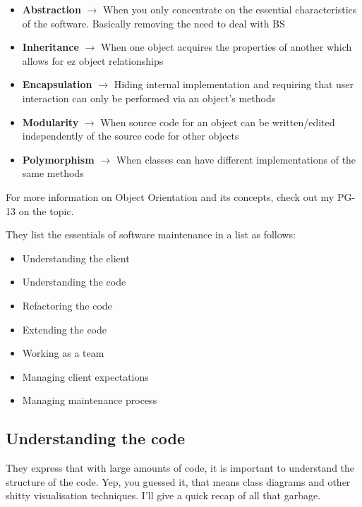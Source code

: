 \documentclass{article}
\begin{document}
\begin{itemize}
    \item \textbf{Abstraction} $\longrightarrow$ When you only concentrate on the essential characteristics of the software. Basically removing the need to deal with BS
    \item \textbf{Inheritance} $\longrightarrow$ When one object acquires the properties of another which allows for ez object relationships
    \item \textbf{Encapsulation} $\longrightarrow$ Hiding internal implementation and requiring that user interaction can only be performed via an object's methods
    \item \textbf{Modularity} $\longrightarrow$ When source code for an object can be written/edited independently of the source code for other objects
    \item \textbf{Polymorphism} $\longrightarrow$ When classes can have different implementations of the same methods
\end{itemize}

For more information on Object Orientation and its concepts, check out my PG-13 \href{https://github.com/pedsm/team40/blob/master/PGP-OO/OOnotes.pdf}{\color{blue}{notes}} on the topic.

\newpage

They list the essentials of software maintenance in a list as follows: 

\begin{itemize}
    \item Understanding the client
    \item Understanding the code
    \item Refactoring the code
    \item Extending the code
    \item Working as a team
    \item Managing client expectations
    \item Managing maintenance process
\end{itemize}

\subsection{Understanding the code}

They express that with large amounts of code, it is important to understand the structure of the code. Yep, you guessed it, that means class diagrams and other shitty visualisation techniques. I'll give a quick recap of all that garbage.
\end{document}
